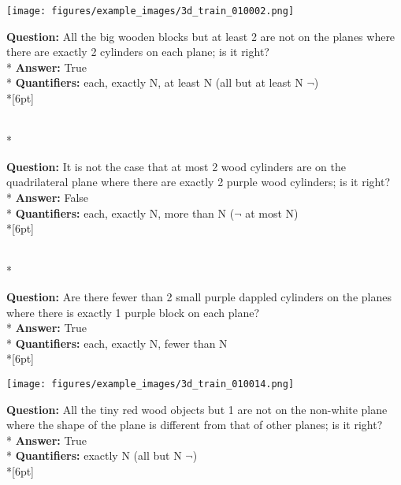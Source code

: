 \begin{figure*}
  \begin{minipage}{0.48\textwidth}
    \texttt{[image: figures/example\_images/3d\_train\_010002.png]}
    \begin{minipage}[t][2.2cm][t]{1\textwidth}
      \footnotesize
      \textbf{Question:} All the big wooden blocks but at least 2 are not on the planes where there are exactly 2 cylinders on each plane; is it right? \\*
      \textbf{Answer:}  True \\*
      \textbf{Quantifiers:} each, exactly N, at least N (all but at least N $\neg$) \\*[6pt]
    \end{minipage}\\*
    \begin{minipage}[t][2.2cm][t]{1\textwidth}
      \footnotesize
      \textbf{Question:} It is not the case that at most 2 wood cylinders are on the quadrilateral plane where there are exactly 2 purple wood cylinders; is it right? \\*
      \textbf{Answer:} False \\*
      \textbf{Quantifiers:} each, exactly N, more than N ($\neg$ at most N)  \\*[6pt]
    \end{minipage}\\*
    \begin{minipage}[t][2.2cm][t]{1\textwidth}
      \footnotesize
      \textbf{Question:} Are there fewer than 2 small purple dappled cylinders on the planes where there is exactly 1 purple block on each plane? \\*
      \textbf{Answer:} True \\*
      \textbf{Quantifiers:} each, exactly N, fewer than N \\*[6pt]
    \end{minipage}
  \end{minipage}
  \hspace{3.5mm}
  \begin{minipage}{0.48\textwidth}
    \texttt{[image: figures/example\_images/3d\_train\_010014.png]}
    \begin{minipage}[t][2.2cm][t]{1\textwidth}
      \footnotesize
      \textbf{Question:} All the tiny red wood objects but 1 are not on the non-white plane where the shape of the plane is different from that of other planes; is it right? \\*
      \textbf{Answer:} True \\*
      \textbf{Quantifiers:} exactly N (all but N $\neg$) \\*[6pt]

\end{minipage}
\end{minipage}
\end{figure*}
